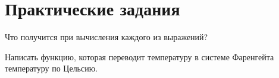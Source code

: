 \chapter{Практические задания}

Что получится при вычисления каждого из выражений?
\begin{figure}[ht!]
\end{figure}

Написать функцию, которая переводит температуру в системе Фаренгейта температуру по Цельсию.
\begin{figure}[ht!]
\end{figure}

